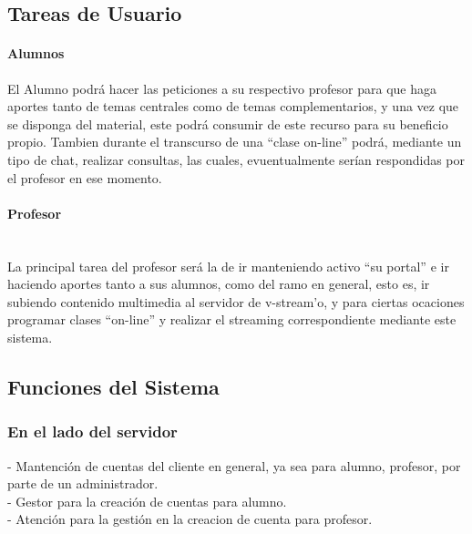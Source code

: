 \documentclass[12pt]{article}
\begin{document}
\newpage
\subsection{Tareas de Usuario}
\paragraph{Alumnos\\}

El Alumno podrá hacer las peticiones a su respectivo profesor para que haga aportes tanto de temas 
centrales como de temas complementarios, y una vez que se disponga del material, este podrá consumir
de este recurso para su beneficio propio. Tambien durante el transcurso de una ``clase on-line'' podrá,
mediante un tipo de chat, realizar consultas, las cuales, evuentualmente serían respondidas por el profesor en ese momento.\\

\paragraph{Profesor\\\\}

La principal tarea del profesor será la de ir manteniendo activo ``su portal'' e ir haciendo aportes
tanto a sus alumnos, como del ramo en general, esto es, ir subiendo contenido multimedia al servidor de 
v-stream'o, y para ciertas ocaciones programar clases ``on-line'' y realizar el streaming correspondiente
mediante este sistema.\\

\subsection{Funciones del Sistema}

\subsubsection{En el lado del servidor}

-	Mantención de cuentas del cliente en general, ya sea para alumno, profesor, por parte de un administrador.\\

-	Gestor para la creación de cuentas para alumno.\\

- 	Atención para la gestión en la creacion de cuenta para profesor.\\
\end{document}
